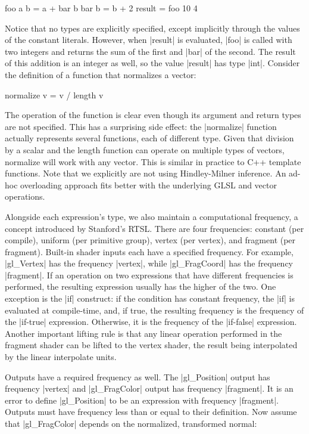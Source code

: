 \documentclass[review]{acmsiggraph}      %
\begin{document}
\begin{MyVerb}
foo a b = a + bar b
bar b = b + 2
result = foo 10 4
\end{MyVerb}

Notice that no types are explicitly specified, except implicitly
through the values of the constant literals.  However, when |result|
is evaluated, |foo| is called with two integers and returns the sum of
the first and |bar| of the second.  The result of this addition is an
integer as well, so the value |result| has type |int|.  Consider the
definition of a function that normalizes a vector:

\begin{MyVerb}
normalize v = v / length v
\end{MyVerb}

The operation of the function is clear even though its argument and
return types are not specified.  This has a surprising side effect:
the |normalize| function actually represents several functions, each
of different type.  Given that division by a scalar and the length
function can operate on multiple types of vectors, normalize will work
with any vector.  This is similar in practice to C++ template
functions.  Note that we explicitly are not using Hindley-Milner
\cite{milner78,damas82} 
inference.  An ad-hoc overloading approach fits better with the
underlying GLSL and vector operations.

Alongside each expression's type, we also maintain a computational
frequency, a concept introduced by Stanford's RTSL.  There are four
frequencies: constant (per compile), uniform (per primitive group),
vertex (per vertex), and fragment (per fragment).  Built-in shader
inputs each have a specified frequency.  For example, |gl_Vertex| has
the frequency |vertex|, while  |gl_FragCoord| has the frequency |fragment|.
If an operation on two expressions that have different frequencies is
performed, the resulting expression usually has the higher of the two.
One exception is the |if| construct: if the condition has constant
frequency, the |if| is evaluated at compile-time, and, if true, the
resulting frequency is the frequency of the |if-true| expression.
Otherwise, it is the frequency of the |if-false| expression.  Another
important lifting rule is that any linear operation performed in the
fragment shader can be lifted to the vertex shader, the result being
interpolated by the linear interpolate units.

Outputs have a required frequency as well.  The |gl_Position| output
has frequency |vertex| and |gl_FragColor| output has frequency
|fragment|.  It is an error to define |gl_Position| to be an
expression with frequency |fragment|.  Outputs must have frequency
less than or equal to their definition.  Now assume that
|gl_FragColor| depends on the normalized, transformed normal:
\end{document}
